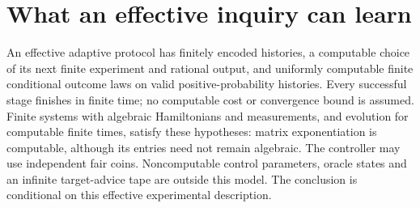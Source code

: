 \section{What an effective inquiry can learn}
\label{sec:inquiry}
An effective adaptive protocol has finitely encoded histories, a
computable choice of its next finite experiment and rational output,
and uniformly computable finite conditional outcome laws on valid
positive-probability histories. Every successful stage finishes in
finite time; no computable cost or convergence bound is assumed.
Finite systems with algebraic Hamiltonians and measurements, and
evolution for computable finite times, satisfy these hypotheses:
matrix exponentiation is computable, although its entries need not
remain algebraic. The controller may use independent fair coins.
Noncomputable control parameters, oracle states and an infinite
target-advice tape are outside this model. The conclusion is
conditional on this effective experimental description.

